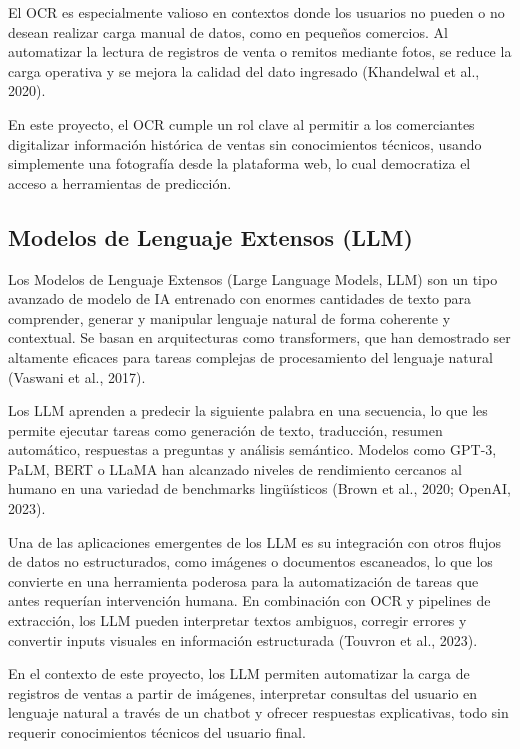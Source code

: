 \indent El OCR es especialmente valioso en contextos donde los usuarios no pueden o no desean realizar carga manual de datos, como en pequeños comercios. Al automatizar la lectura de registros de venta o remitos mediante fotos, se reduce la carga operativa y se mejora la calidad del dato ingresado (Khandelwal et al., 2020).

\indent En este proyecto, el OCR cumple un rol clave al permitir a los comerciantes digitalizar información histórica de ventas sin conocimientos técnicos, usando simplemente una fotografía desde la plataforma web, lo cual democratiza el acceso a herramientas de predicción.


\subsection{Modelos de Lenguaje Extensos (LLM)}

\indent Los Modelos de Lenguaje Extensos (Large Language Models, LLM) son un tipo avanzado de modelo de IA entrenado con enormes cantidades de texto para comprender, generar y manipular lenguaje natural de forma coherente y contextual. Se basan en arquitecturas como transformers, que han demostrado ser altamente eficaces para tareas complejas de procesamiento del lenguaje natural (Vaswani et al., 2017).

\indent Los LLM aprenden a predecir la siguiente palabra en una secuencia, lo que les permite ejecutar tareas como generación de texto, traducción, resumen automático, respuestas a preguntas y análisis semántico. Modelos como GPT-3, PaLM, BERT o LLaMA han alcanzado niveles de rendimiento cercanos al humano en una variedad de benchmarks lingüísticos (Brown et al., 2020; OpenAI, 2023).

\indent Una de las aplicaciones emergentes de los LLM es su integración con otros flujos de datos no estructurados, como imágenes o documentos escaneados, lo que los convierte en una herramienta poderosa para la automatización de tareas que antes requerían intervención humana. En combinación con OCR y pipelines de extracción, los LLM pueden interpretar textos ambiguos, corregir errores y convertir inputs visuales en información estructurada (Touvron et al., 2023).

\indent En el contexto de este proyecto, los LLM permiten automatizar la carga de registros de ventas a partir de imágenes, interpretar consultas del usuario en lenguaje natural a través de un chatbot y ofrecer respuestas explicativas, todo sin requerir conocimientos técnicos del usuario final.

